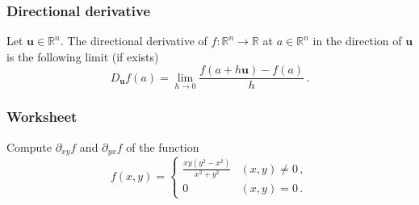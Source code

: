 \documentclass[aspectratio=169,handout]{beamer}
\begin{document}
\begin{frame}
    \frametitle{ Directional derivative  }
\begin{definition}
Let \(\mathbf{u} \in \mathbb{R}^n\). The directional derivative of \(f:\mathbb{R}^n \to \mathbb{R}\) at \(a\in \mathbb{R}^n\)
in the direction of \(\mathbf{u}\) is the following limit (if exists)
\begin{equation*}
    D_{\mathbf{u}} f(a) = \lim_{h \to 0} \frac{ f( a + h \mathbf{u}) - f(a)}{h}\,.
\end{equation*}
\end{definition}
\end{frame}

\begin{frame}
    \frametitle{ Worksheet }
    Compute $\partial_{xy} f$ and $\partial_{yx} f$ of the function
    \begin{equation*}
        f(x,y) = 
        \begin{cases}
            \frac{xy(y^2 - x^2)}{x^2 + y^2}  & (x,y) \not= 0 \,, \\
            0 & (x,y) = 0 \,.
        \end{cases}
    \end{equation*}
\end{frame}
\end{document}
